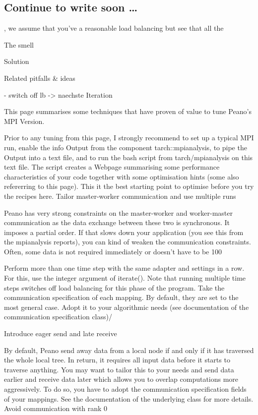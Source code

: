 \subsection{Continue to write soon \ldots}
, we assume that you've a reasonable load balancing but see that all
the
  
  The smell
  
  Solution
  
  Related pitfalls \& ideas
  
  - switch off lb -> naechste Iteration
  
  
  
This page summarises some techniques that have proven of value to tune Peano's MPI Version.

Prior to any tuning from this page, I strongly recommend to set up a typical MPI run, enable the info Output from the component tarch::mpianalysis, to pipe the Output into a text file, and to run the bash script from tarch/mpianalysis on this text file. The script creates a Webpage summarising some performance characteristics of your code together with some optimisation hints (some also refererring to this page). This it the best starting point to optimise before you try the recipes here.
Tailor master-worker communication and use multiple runs

Peano has very strong constraints on the master-worker and worker-master communication as the data exchange between these two is synchronous. It imposes a partial order. If that slows down your application (you see this from the mpianalysis reports), you can kind of weaken the communication constraints. Often, some data is not required immediately or doesn't have to be 100%

    Perform more than one time step with the same adapter and settings in a row. For this, use the integer argument of iterate(). Note that running multiple time steps switches off load balancing for this phase of the program.
    Take the communication specification of each mapping. By default, they are set to the most general case. Adopt it to your algorithmic needs (see documentation of the communication specification class)/

Introduce eager send and late receive

By default, Peano send away data from a local node if and only if it has traversed the whole local tree. In return, it requires all input data before it starts to traverse anything. You may want to tailor this to your needs and send data earlier and receive data later which allows you to overlap computations more aggressively. To do so, you have to adopt the communication specification fields of your mappings. See the documentation of the underlying class for more details.
Avoid communication with rank 0

